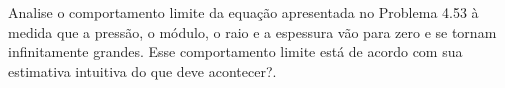 Analise o comportamento limite da equação apresentada no Problema 4.53 à medida que a pressão, o módulo, o raio e a espessura vão para zero e se tornam infinitamente grandes. Esse comportamento limite está de acordo com sua estimativa intuitiva do que deve acontecer?.

